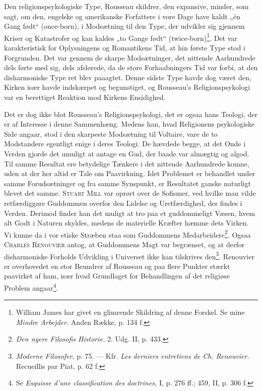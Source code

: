 \documentclass[12pt,a4paper,openany]{book}
\newcommand{\opage}[1]{\marginnote{\footnotesize\textit{[#1]}}}
\begin{document}
Den religionspsykologiske Type, Rousseau skildrer, den expansive,
minder, som sagt, om den, engelske og amerikanske Forfattere
i vore Dage have kaldt „én Gang født“ (once-born), i Modsætning
til den Type, der udvikler sig gjennem Kriser og Katastrofer
og kan kaldes „to Gange født“ (twice-born)\footnote[1]{William James har givet en glimrende Skildring af denne Forskel. Se mine \textit{Mindre Arbejder.} Anden Række, p. 134 f.}. Det var
karakteristisk for Oplysningens og Romantikens Tid, at hin
første Type stod i Forgrunden. Det var gennem de skarpe
Modsætninger, det nittende Aarhundrede dels førte med sig,
dels afslørede, da de store Forhaabningers Tid var forbi, at den
disharmoniske Type ret blev paaagtet. Denne sidste Type
havde dog været den, Kirken især havde indskærpet og begunstiget,
og Rousseau’s Religionspsykologi var en berettiget
Reaktion mod Kirkens Ensidighed.

Det er dog ikke blot Rousseau’s Religionspsykologi, det er
ogsaa hans Teologi, der er af Interesse i denne Sammenhæng.
Medens han, hvad Religionens psykologiske Side angaar, stod i
den skarpeste Modsætning til Voltaire, vare de to Modstandere
\setcounter{footnote}{0}%
\opage{135}egentligt enige i deres Teologi. De hævdede begge, at det
Onde i Verden gjorde det umuligt at antage en Gud, der
baade var almægtig og algod. Til samme Resultat ere betydelige
Tænkere i det nittende Aarhundrede komne, uden at der
her altid er Tale om Paavirkning. Idet Problemet er behandlet
under samme Forudsætninger og fra samme Synspunkt, er Resultatet
ganske naturligt blevet det samme. \textsc{Stuart Mill} var
oprørt over de Sofismer, ved hvilke man vilde retfærdiggøre
Guddommen overfor den Lidelse og Uretfærdighed, der findes
i Verden. Derimod finder han det muligt at tro paa et guddommeligt
Væsen, hvem alt Godt i Naturen skyldes, medens
de materielle Kræfter hæmme dets Virken. Vi kunne da i vor
etiske Stræben staa som Guddommens Medarbeidere\footnote[1]{\textit{Den nyere Filosofis Historie.} 2. Udg. II, p. 433.}. Ogsaa
\textsc{Charles Renouvier} antog, at Guddommens Magt var begrænset,
og at derfor disharmoniske Forholds Udvikling i Universet
ikke kan tilskrives den\footnote[2]{\textit{Moderne Filosofer,} p. 75. --- Kfr. \textit{Les derniers entretiens de Ch. Renouvier.} Recueillis par Piat, p. 62 f.}. Renouvier er overhovedet en stor
Beundrer af Rousseau og paa flere Punkter stærkt paavirket af
ham, især hvad Grundlaget for Behandlingen af det religiøse
Problem angaar\footnote[3]{Se \textit{Esquisse d’une classification des doctrines,} I, p. 276 ff.; 459, II, p. 306 f.}.
\end{document}
